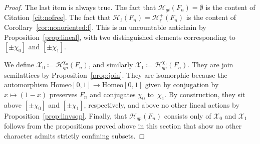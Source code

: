 \documentclass[10pt,a4paper]{article}
\theoremstyle{definition}
\theoremstyle{remark}
\newcommand{\Homeo}{\mathrm{Homeo}}
\newcommand{\Hyp}{\mathcal{H}}
\newcommand{\X}{\mathcal{X}}
\theoremstyle{plain}
\begin{document}
\begin{proof}
The last item is always true. The fact that $\Hyp_{gt}(F_n) = \emptyset$ is the content of Citation~\ref{cit:nofree}. The fact that $\Hyp_{\ell}(F_n) = \Hyp_{\ell}^+(F_n)$ is the content of Corollary~\ref{cor:nonoriented:f}. This is an uncountable antichain by Proposition~\ref{prop:lineal}, with two distinguished elements corresponding to $[\pm\chi_0]$ and $[\pm\chi_1]$.

We define $\X_0 \coloneqq \Hyp_{qp}^{\chi_0}(F_n)$, and similarly $\X_1 \coloneqq \Hyp_{qp}^{\chi_1}(F_n)$. They are join semilattices by Proposition~\ref{prop:join}. They are isomorphic because the automorphism $\Homeo[0, 1] \to \Homeo[0, 1]$ given by conjugation by $x \mapsto (1 - x)$ preserves $F_n$ and conjugates $\chi_0$ to~$\chi_1$. By construction, they sit above $[\pm\chi_0]$ and $[\pm\chi_1]$, respectively, and above no other lineal actions by Proposition~\ref{prop:linvsqp}. Finally, that $\Hyp_{qp}(F_n)$ consists only of $\X_0$ and $\X_1$ follows from the propositions proved above in this section that show no other character admits strictly confining subsets.
\end{proof}
\end{document}

